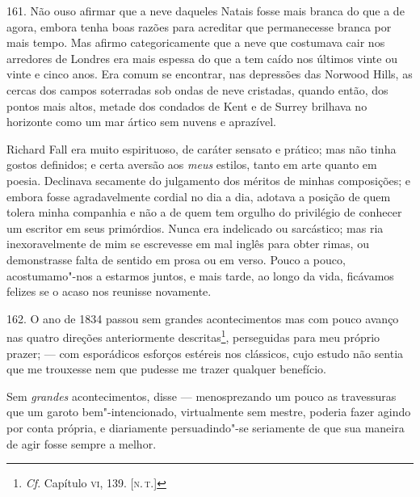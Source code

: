 161. Não ouso afirmar que a neve daqueles Natais fosse mais branca do
que a de agora, embora tenha boas razões para acreditar que permanecesse
branca por mais tempo. Mas afirmo categoricamente que a neve que
costumava cair nos arredores de Londres era mais espessa do que a tem
caído nos últimos vinte ou vinte e cinco anos. Era comum se encontrar,
nas depressões das Norwood Hills, as cercas dos campos soterradas sob
ondas de neve cristadas, quando então, dos pontos mais altos, metade dos
condados de Kent e de Surrey brilhava no horizonte como um mar ártico
sem nuvens e aprazível.

Richard Fall era muito espirituoso, de caráter sensato e prático; mas
não tinha gostos definidos; e certa aversão aos \emph{meus} estilos,
tanto em arte quanto em poesia. Declinava secamente do julgamento dos
méritos de minhas composições; e embora fosse agradavelmente cordial no
dia a dia, adotava a posição de quem tolera minha companhia e não a de
quem tem orgulho do privilégio de conhecer um escritor em seus
primórdios. Nunca era indelicado ou sarcástico; mas ria inexoravelmente
de mim se escrevesse em mal inglês para obter rimas, ou demonstrasse
falta de sentido em prosa ou em verso. Pouco a pouco, acostumamo"-nos a
estarmos juntos, e mais tarde, ao longo da vida, ficávamos felizes se o
acaso nos reunisse novamente.

162. O ano de 1834 passou sem grandes acontecimentos mas com pouco
avanço nas quatro direções anteriormente descritas\footnote{\emph{Cf}.
  Capítulo \textsc{vi}, 139. {[}\textsc{n.\,t.}{]}}, perseguidas para meu próprio
prazer; --- com esporádicos esforços estéreis nos clássicos, cujo estudo
não sentia que me trouxesse nem que pudesse me trazer qualquer
benefício.

Sem \emph{grandes} acontecimentos, disse --- menosprezando um pouco as
travessuras que um garoto bem"-intencionado, virtualmente sem mestre,
poderia fazer agindo por conta própria, e diariamente persuadindo"-se
seriamente de que sua maneira de agir fosse sempre a melhor.

